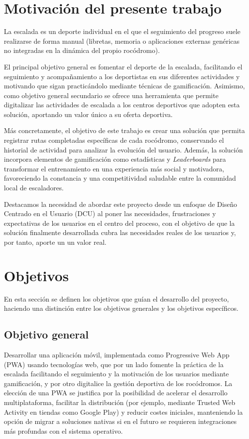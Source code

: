 \section{Motivación del presente trabajo}

La escalada es un deporte individual en el que el seguimiento del progreso suele realizarse de forma manual (libretas, memoria o aplicaciones externas genéricas no integradas en la dinámica del propio rocódromo). 

El principal objetivo general es fomentar el deporte de la escalada, facilitando el seguimiento y acompañamiento a los deportistas en sus diferentes actividades y motivando que sigan practicándolo mediante técnicas de gamificación. Asimismo, como objetivo general secundario se ofrece una herramienta que permite digitalizar las actividades de escalada a los centros deportivos que adopten esta solución, aportando un valor único a su oferta deportiva.

Más concretamente, el objetivo de este trabajo es crear una solución que permita registrar rutas completadas específicas de cada rocódromo, conservando el historial de actividad para analizar la evolución del usuario. Además, la solución incorpora elementos de gamificación como estadísticas y \textit{Leaderboards} para transformar el entrenamiento en una experiencia más social y motivadora, favoreciendo la constancia y una competitividad saludable entre la comunidad local de escaladores.

Destacamos la necesidad de abordar este proyecto desde un enfoque de Diseño Centrado en el Usuario (DCU) al poner las necesidades, frustraciones y expectativas de los usuarios en el centro del proceso, con el objetivo de que la solución finalmente desarrollada cubra las necesidades reales de los usuarios y, por tanto, aporte un un valor real.


\section{Objetivos}

En esta sección se definen los objetivos que guían el desarrollo del proyecto, haciendo una distinción entre los objetivos generales y los objetivos específicos.

\subsection{Objetivo general}

Desarrollar una aplicación móvil, implementada como Progressive Web App (PWA) usando tecnologías web, que por un lado fomente la práctica de la escalada facilitando el seguimiento y la motivación de los usuarios mediante gamificación, y por otro digitalice la gestión deportiva de los rocódromos. La elección de una PWA se justifica por la posibilidad de acelerar el desarrollo multiplataforma, facilitar la distribución (por ejemplo, mediante Trusted Web Activity en tiendas como Google Play) y reducir costes iniciales, manteniendo la opción de migrar a soluciones nativas si en el futuro se requieren integraciones más profundas con el sistema operativo.

